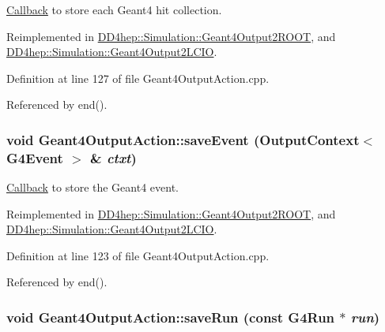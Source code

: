 \hyperlink{class_d_d4hep_1_1_callback}{Callback} to store each Geant4 hit collection. 

Reimplemented in \hyperlink{class_d_d4hep_1_1_simulation_1_1_geant4_output2_r_o_o_t_a1f61031bde79ed84a62145cb32ac4428}{DD4hep::Simulation::Geant4Output2ROOT}, and \hyperlink{class_d_d4hep_1_1_simulation_1_1_geant4_output2_l_c_i_o_aeba8f94323098614ee901a3ff0642c73}{DD4hep::Simulation::Geant4Output2LCIO}.

Definition at line 127 of file Geant4OutputAction.cpp.

Referenced by end().\hypertarget{class_d_d4hep_1_1_simulation_1_1_geant4_output_action_a660080e931d757573839927ca99bfbed}{
\subsubsection[{saveEvent}]{\setlength{\rightskip}{0pt plus 5cm}void Geant4OutputAction::saveEvent ({\bf OutputContext}$<$ G4Event $>$ \& {\em ctxt})}}
\label{class_d_d4hep_1_1_simulation_1_1_geant4_output_action_a660080e931d757573839927ca99bfbed}


\hyperlink{class_d_d4hep_1_1_callback}{Callback} to store the Geant4 event. 

Reimplemented in \hyperlink{class_d_d4hep_1_1_simulation_1_1_geant4_output2_r_o_o_t_a0562da9b5fdb0f81fa8d14457fd3f319}{DD4hep::Simulation::Geant4Output2ROOT}, and \hyperlink{class_d_d4hep_1_1_simulation_1_1_geant4_output2_l_c_i_o_a86749213718dcb1ed4783ab86a374d92}{DD4hep::Simulation::Geant4Output2LCIO}.

Definition at line 123 of file Geant4OutputAction.cpp.

Referenced by end().\hypertarget{class_d_d4hep_1_1_simulation_1_1_geant4_output_action_a4016b3e0ee787a3ac3d1fcd7a4c84a68}{
\subsubsection[{saveRun}]{\setlength{\rightskip}{0pt plus 5cm}void Geant4OutputAction::saveRun (const G4Run $\ast$ {\em run})}}
\label{class_d_d4hep_1_1_simulation_1_1_geant4_output_action_a4016b3e0ee787a3ac3d1fcd7a4c84a68}



